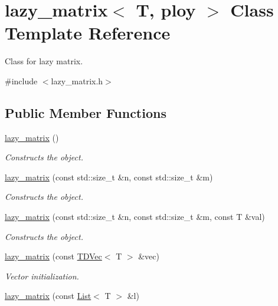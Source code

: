 \hypertarget{classlazy__matrix}{}\section{lazy\+\_\+matrix$<$ T, ploy $>$ Class Template Reference}
\label{classlazy__matrix}


Class for lazy matrix.  




{\ttfamily \#include $<$lazy\+\_\+matrix.\+h$>$}

\subsection*{Public Member Functions}
\begin{DoxyCompactItemize}
\item 
\mbox{\hyperlink{classlazy__matrix_a99f0fbe76db34e2ff6156ab644f06829}{lazy\+\_\+matrix}} ()
\begin{DoxyCompactList}\small\item\em Constructs the object. \end{DoxyCompactList}\item 
\mbox{\hyperlink{classlazy__matrix_a25ac7f5573206b9b4338240fdcdcf110}{lazy\+\_\+matrix}} (const std\+::size\+\_\+t \&n, const std\+::size\+\_\+t \&m)
\begin{DoxyCompactList}\small\item\em Constructs the object. \end{DoxyCompactList}\item 
\mbox{\hyperlink{classlazy__matrix_ab3eaf8b190b2e1d8c51ee31d23f7f38b}{lazy\+\_\+matrix}} (const std\+::size\+\_\+t \&n, const std\+::size\+\_\+t \&m, const T \&val)
\begin{DoxyCompactList}\small\item\em Constructs the object. \end{DoxyCompactList}\item 
\mbox{\hyperlink{classlazy__matrix_a2c87767de51163379f301de906d6a231}{lazy\+\_\+matrix}} (const \mbox{\hyperlink{lazy__matrix_8h_ab6e3d9072e9f4b56c531bef4d02d2652}{T\+D\+Vec}}$<$ T $>$ \&vec)
\begin{DoxyCompactList}\small\item\em Vector initialization. \end{DoxyCompactList}\item 
\mbox{\hyperlink{classlazy__matrix_aec8178a41ca97d895e1e20dbed365d02}{lazy\+\_\+matrix}} (const \mbox{\hyperlink{lazy__matrix_8h_a9421479667ba20cc5361aa756ae056d7}{List}}$<$ T $>$ \&l)

\end{DoxyCompactItemize}
